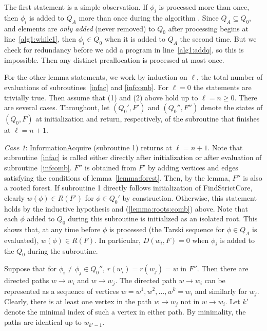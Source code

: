 \documentclass[11pt,reqno]{amsart}
\theoremstyle{definition}
\numberwithin{equation}{section}
\newcommand{\pre}{\phi}
\newcommand{\sub}{\subseteq}
\newcommand{\acto}{Q_0}
\newcommand{\acta}{Q_A}
\newcommand{\forest}{F}
\newcommand{\roott}{R}
\newcommand{\depth}{D}
\begin{document}
The first statement is a simple observation.
If $\pre_i$ is processed more than once, then $\pre_i$ is added to $\acta$ more than once during the algorithm . 
Since $\acta \sub \acto$, and elements are \emph{only added} (never removed) to $\acto$ after processing begins at line~\ref{alg1:while1}, then $\pre_i \in \acto$ when it is added to $\acta$ the second time. 
But we check for redundancy before we add a program in line~\ref{alg1:addq}, so this is impossible. 
Then any distinct preallocation is processed at most once. 

For the other lemma statements, we work by induction on $\ell$, the total number of evaluations of subroutines~\ref{infac} and \ref{infcomb}. 
For $\ell = 0$ the statements are trivially true. 
Then assume that (1) and (2) above hold up to $\ell = n \geq 0$. 
There are several cases. 
Throughout, let $(\acto',\forest')$ and $(\acto'',\forest'')$ denote the states of $(\acto,\forest)$ at initialization and return, respectively, of the subroutine that finishes at $\ell = n + 1$.  

\emph{Case 1}: InformationAcquire (subroutine 1) returns at $\ell = n + 1$. 
Note that subroutine~\ref{infac} is called either directly after initialization or after evaluation of subroutine~\ref{infcomb}. 
$\forest''$ is obtained from $\forest'$ by adding vertices and edges satisfying the conditions of lemma~\ref{lemma:forest}. 
Then, by the lemma, $\forest''$ is also a rooted forest.
If subroutine 1 directly follows initialization of FindStrictCore, clearly $w(\pre) \in \roott(\forest')$ for $\pre \in \acto'$ by construction.
Otherwise, this statement holds by the inductive hypothesis and (\ref{lemma:roots:comb}) above. 
Note that each $\pre$ added to $\acto$ during this subroutine is initialized as an isolated root. 
This shows that, at any time before $\pre$ is processed (the Tarski sequence for $\pre \in \acta$ is evaluated), $w(\pre) \in \roott(\forest)$. 
In particular, $\depth(w_i, \forest) = 0$ when $\pre_i$ is added to the $\acto$ during the subroutine. 

Suppose that for $\pre_i \not = \pre_j \in \acto''$, $r(w_i) = r(w_j) = w$ in $\forest''$. 
Then there are directed paths $w \to w_i$ and $w \to w_j$. 
The directed path $w \to w_i$ can be represented as a sequence of vertices $w = w^1,w^2,\hdots, w^k = w_i$ and similarly for $w_j$. 
Clearly, there is at least one vertex in the path $w \to w_j$ not in $w \to w_i$. 
Let $k'$ denote the minimal index of such a vertex in either path. 
By minimality, the paths are identical up to $w_{k' - 1}$. 
\end{document}
